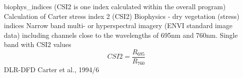 %
{ %
biophys\_indices (CSI2 is one index calculated within the overall program)
}
%
{ %
Calculation of Carter stress index 2 (CSI2)
}
%
{ %
Biophysics - dry vegetation (stress) indices
}
%
{ %
Narrow band multi- or hyperspectral imagery (ENVI standard image data) including channels close to the wavelengths of 695nm and 760nm.\bigskip
}
%
{ %
Single band with CSI2 values
}
%
{ %
\begin{displaymath}
CSI2 = \frac{R_{695}}{R_{760}}
\end{displaymath}
}
%
{ %
DLR-DFD
}
%
{ %
Carter et al., 1994/6
}
